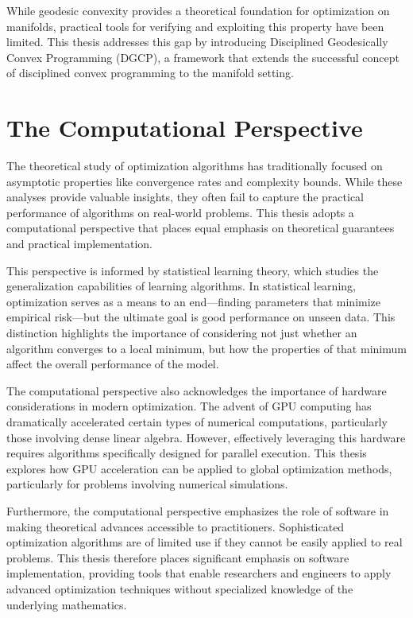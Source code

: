 While geodesic convexity provides a theoretical foundation for optimization on manifolds, practical tools for verifying and exploiting this property have been limited. This thesis addresses this gap by introducing Disciplined Geodesically Convex Programming (DGCP), a framework that extends the successful concept of disciplined convex programming to the manifold setting.

\section{The Computational Perspective}

The theoretical study of optimization algorithms has traditionally focused on asymptotic properties like convergence rates and complexity bounds. While these analyses provide valuable insights, they often fail to capture the practical performance of algorithms on real-world problems. This thesis adopts a computational perspective that places equal emphasis on theoretical guarantees and practical implementation.

This perspective is informed by statistical learning theory, which studies the generalization capabilities of learning algorithms. In statistical learning, optimization serves as a means to an end—finding parameters that minimize empirical risk—but the ultimate goal is good performance on unseen data. This distinction highlights the importance of considering not just whether an algorithm converges to a local minimum, but how the properties of that minimum affect the overall performance of the model.

The computational perspective also acknowledges the importance of hardware considerations in modern optimization. The advent of GPU computing has dramatically accelerated certain types of numerical computations, particularly those involving dense linear algebra. However, effectively leveraging this hardware requires algorithms specifically designed for parallel execution. This thesis explores how GPU acceleration can be applied to global optimization methods, particularly for problems involving numerical simulations.

Furthermore, the computational perspective emphasizes the role of software in making theoretical advances accessible to practitioners. Sophisticated optimization algorithms are of limited use if they cannot be easily applied to real problems. This thesis therefore places significant emphasis on software implementation, providing tools that enable researchers and engineers to apply advanced optimization techniques without specialized knowledge of the underlying mathematics.


